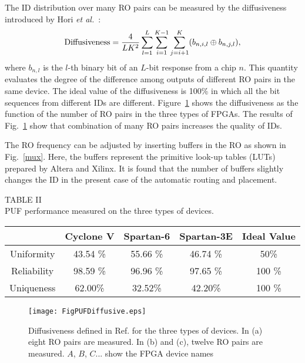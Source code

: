 ﻿\documentclass[aps,preprint,prb,superscriptaddress,amsmath,showpacs,tightenlines]{revtex4}
\begin{document}
The ID distribution over many RO pairs can be 
measured by the diffusiveness introduced by Hori {\it et al.}~\cite{Hori}:
\begin{equation}
{\rm Diffusiveness}
=\frac{4}{LK^2}\sum_{l=1}^L \sum_{i=1}^{K-1}\sum_{j=i+1}^K (b_{n,i,l} \oplus b_{n,j,l}),
\end{equation}
where $b_{n,l}$ is the $l$-th binary bit of an $L$-bit response from a chip $n$.
This quantity evaluates the degree of the difference among outputs of different RO pairs 
in the same device.
The ideal value of the diffusiveness is 100\% in which all the bit
sequences from different IDs are different.
Figure~\ref{diffusive} shows the diffusiveness as the 
function of the number of RO pairs in the three types of FPGAs.
The results of Fig.~\ref{diffusive} show that 
combination of many RO pairs increases the quality of IDs.

The RO frequency can be adjusted by inserting buffers in the RO as shown 
in Fig.~\ref{mux}. Here, the buffers represent the primitive look-up tables (LUTs) prepared by 
Altera and Xilinx. 
It is found that the number of buffers  slightly changes the ID 
in the present case of the automatic routing and placement. 


\begin{table}
\begin{center}
TABLE II\\
{PUF performance measured on the three types of devices}. 
\end{center}
\begin{tabular}{|c|c|c|c|c|}\hline
&  Cyclone V &  Spartan-6 &  Spartan-3E &  Ideal Value
\\ \hline
Uniformity 
& 43.54  \%
& 55.66 \%
& 46.74 \%
& 50\%
\\
Reliability
& 98.59 \%
& 96.96 \%
& 97.65 \%
& 100 \%
\\
Uniqueness
& 62.00\%
& 32.52\%
& 42.20\%
& 100 \%
\\ \hline
\end{tabular}
\end{table}
\begin{figure}
\centering
\texttt{[image: FigPUFDiffusive.eps]}
\caption{
Diffusiveness defined in Ref.\cite{Hori} for 
the three types of devices.
In (a) eight RO pairs are measured. In (b) and (c), twelve RO pairs are measured.
$A$, $B$, $C$... show the FPGA device names} 
\label{diffusive}
\end{figure}
\end{document}
